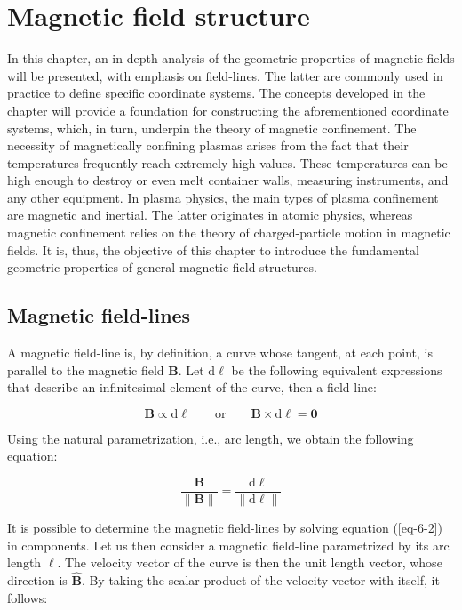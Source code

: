 \chapter{Magnetic field structure}

\label{magnetic-field-structure}

In this chapter, an in-depth analysis of the geometric properties of magnetic fields will be presented, with emphasis on field-lines. The latter are commonly used in practice to define specific coordinate systems. The concepts developed in the chapter will provide a foundation for constructing the aforementioned coordinate systems, which, in turn, underpin the theory of magnetic confinement. The necessity of magnetically confining plasmas arises from the fact that their temperatures frequently reach extremely high values. These temperatures can be high enough to destroy or even melt container walls, measuring instruments, and any other equipment. In plasma physics, the main types of plasma confinement are magnetic and inertial. The latter originates in atomic physics, whereas magnetic confinement relies on the theory of charged-particle motion in magnetic fields. It is, thus, the objective of this chapter to introduce the fundamental geometric properties of general magnetic field structures.

\section{Magnetic field-lines}

A magnetic field-line is, by definition, a curve whose tangent, at each point, is parallel to the magnetic field $\mathbf{B}$. Let $\mathrm{d}\boldsymbol{\ell}$ be the following equivalent expressions that describe an infinitesimal element of the curve, then a field-line:

\begin{equation}
    \mathbf{B}\propto\mathrm{d}\boldsymbol{\ell}\quad\quad \text{or}\quad\quad\mathbf{B}\times\mathrm{d}\boldsymbol{\ell}=\mathbf{0}
\end{equation}

Using the natural parametrization, i.e., arc length, we obtain the following equation:

\begin{equation}
    \label{eq-6-2}
    \frac{\mathbf{B}}{\|\mathbf{B}\|}=\frac{\mathrm{d}\boldsymbol{\ell}}{\|\mathrm{d}\boldsymbol{\ell}\|}
\end{equation}

It is possible to determine the magnetic field-lines by solving equation (\ref{eq-6-2}) in components. Let us then consider a magnetic field-line parametrized by its arc length $\ell$. The velocity vector of the curve is then the unit length vector, whose direction is $\mathbf{\hat{B}}$. By taking the scalar product of the velocity vector with itself, it follows:

